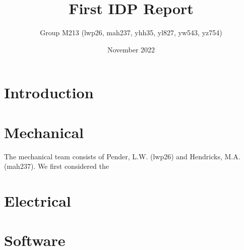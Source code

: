 \documentclass{article}
\title{First IDP Report}
\author{Group M213 (lwp26, mah237, yhh35, yl827, yw543, yz754)}
\date{November 2022}
\begin{document}
\maketitle

\section{Introduction}
    
\section{Mechanical}
\quad The mechanical team consists of Pender, L.W. (lwp26) and Hendricks, M.A.(mah237). We first considered the 

\section{Electrical}



\section{Software}
\end{document}
